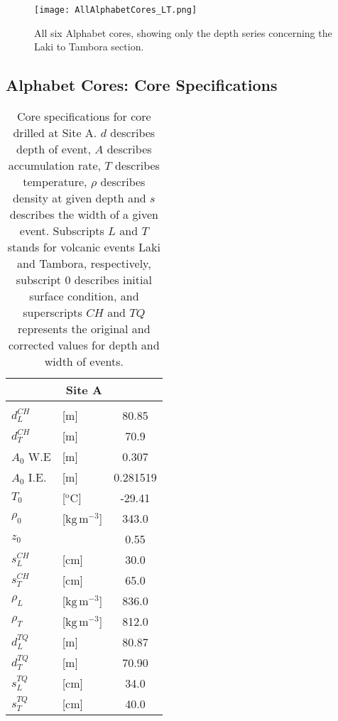 \documentclass[../../CompleteThesis2/Complete_2ndDraft.tex]{subfiles}
\begin{document}
	\begin{figure}[H]
		\centering
		\texttt{[image: AllAlphabetCores\_LT.png]}
		\caption[]{All six Alphabet cores, showing only the depth series concerning the Laki to Tambora section.}
		\label{fig:AllAlphabetCores_LT}
	\end{figure}
	\newpage
	
	\subsection[Core Specs]{Alphabet Cores: Core Specifications}
	\begin{table}[h]
		\centering
		\begin{tabular}{l l|c}
			\multicolumn{3}{c}{\textbf{Site A}} \\[0.1cm] 
			\hline 
			&& \\
			$d_{L}^{CH}$ & [m] & 80.85 \\[0.15cm]
			$d_{T}^{CH}$ & [m] & 70.9 \\[0.15cm]
			$A_0$ W.E & [m] & 0.307 \\[0.15cm]
			$A_0$ I.E. & [m] & 0.281519 \\[0.15cm]
			$T_0$ & [$^{\text{o}}$C] & -29.41 \\[0.15cm]
			$\rho_0$ & [$\text{kg}\,\text{m}^{-3}$] & 343.0\\[0.15cm]
			$z_0$ & & 0.55 \\[0.15cm]
			$s_L^{CH}$ & [cm] & 30.0 \\[0.15cm]
			$s_T^{CH}$ & [cm] & 65.0 \\[0.15cm]
			$\rho_L$ & [$\text{kg}\,\text{m}^{-3}$] & 836.0 \\[0.15cm]
			$\rho_T$ & [$\text{kg}\,\text{m}^{-3}$] & 812.0 \\[0.15cm]		
			$d_{L}^{TQ}$ & [m] & 80.87 \\[0.15cm]
			$d_{T}^{TQ}$ & [m] & 70.90 \\[0.15cm]
			$s_L^{TQ}$ & [cm] & 34.0 \\[0.15cm]
			$s_T^{TQ}$ & [cm] & 40.0 \\[0.15cm]
			
		\end{tabular}
		\caption{\footnotesize Core specifications for core drilled at Site A. $d$ describes depth of event, $A$ describes accumulation rate, $T$ describes temperature, $\rho$ describes density at given depth and $s$ describes the width of a given event. Subscripts $L$ and $T$ stands for volcanic events Laki and Tambora, respectively, subscript $0$ describes initial surface condition, and superscripts $CH$ and $TQ$ represents the original and corrected values for depth and width of events.}
		\label{Tab:SiteA_CoreSpecs}
	\end{table}
	\newpage
\end{document}
